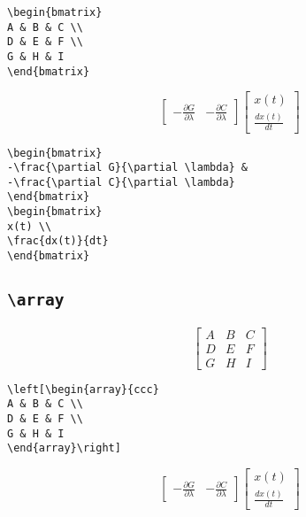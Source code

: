 \documentclass[journal]{IEEEtran}
\begin{document}
\begin{verbatim}
\begin{bmatrix} 
A & B & C \\ 
D & E & F \\ 
G & H & I 
\end{bmatrix}
\end{verbatim}

$$
\begin{bmatrix}
-\frac{\partial G}{\partial \lambda} &
-\frac{\partial C}{\partial \lambda}
\end{bmatrix}
\begin{bmatrix}	
x(t) \\
\frac{dx(t)}{dt} 
\end{bmatrix}
$$

\begin{verbatim}
\begin{bmatrix}
-\frac{\partial G}{\partial \lambda} &
-\frac{\partial C}{\partial \lambda}
\end{bmatrix}
\begin{bmatrix}	
x(t) \\
\frac{dx(t)}{dt} 
\end{bmatrix}
\end{verbatim}

\subsection{\texttt{\textbackslash array}}

$$\left[\begin{array}{ccc}
A & B & C \\ 
D & E & F \\ 
G & H & I 
\end{array}\right]$$

\begin{verbatim}
\left[\begin{array}{ccc}
A & B & C \\ 
D & E & F \\ 
G & H & I 
\end{array}\right]
\end{verbatim}

$$\left[\begin{array}{cc}
-\frac{\partial G}{\partial \lambda} &
-\frac{\partial C}{\partial \lambda}
\end{array}\right]
\left[\begin{array}{c}	
x(t) \\
\frac{dx(t)}{dt} 
\end{array}\right]$$
\end{document}
